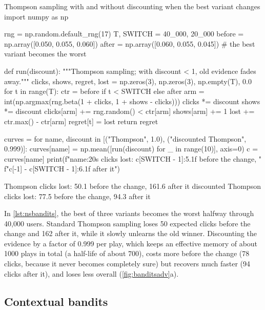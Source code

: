 \begin{pylisting}[label={lst:nsbandits}]{Thompson sampling with and without discounting when the best variant changes}
import numpy as np

rng = np.random.default_rng(17)
T, SWITCH = 40_000, 20_000
before = np.array([0.050, 0.055, 0.060])
after = np.array([0.060, 0.055, 0.045])              # the best variant becomes the worst

def run(discount):
    """Thompson sampling; with discount < 1, old evidence fades away."""
    clicks, shows, regret, lost = np.zeros(3), np.zeros(3), np.empty(T), 0.0
    for t in range(T):
        ctr = before if t < SWITCH else after
        arm = int(np.argmax(rng.beta(1 + clicks, 1 + shows - clicks)))
        clicks *= discount
        shows *= discount
        clicks[arm] += rng.random() < ctr[arm]
        shows[arm] += 1
        lost += ctr.max() - ctr[arm]
        regret[t] = lost
    return regret

curves = {}
for name, discount in [("Thompson", 1.0), ("discounted Thompson", 0.999)]:
    curves[name] = np.mean([run(discount) for _ in range(10)], axis=0)
    c = curves[name]
    print(f"{name:20s} clicks lost: {c[SWITCH - 1]:5.1f} before the change, "
          f"{c[-1] - c[SWITCH - 1]:6.1f} after it")
\end{pylisting}
\begin{pyoutput}
Thompson             clicks lost:  50.1 before the change,  161.6 after it
discounted Thompson  clicks lost:  77.5 before the change,   94.3 after it
\end{pyoutput}

In \cref{lst:nsbandits}, the best of three variants becomes the worst halfway through 40,000 users. Standard Thompson sampling loses 50 expected
clicks before the change and 162 after it, while it slowly unlearns the old winner. Discounting the evidence by a factor of 0.999 per play, which
keeps an effective memory of about 1000 plays in total (a half-life of about 700), costs more before the change (78 clicks, because it never becomes completely sure) but recovers much faster
(94 clicks after it), and loses less overall (\cref{fig:banditsadv}a).

\subsection{Contextual bandits}

